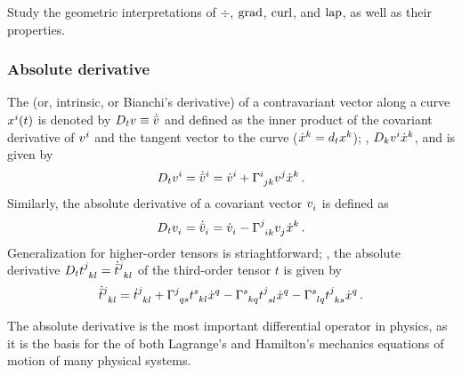 \begin{remark}
  Study the geometric interpretations of $\div$, $\operatorname{grad}$, $\operatorname{curl}$, and $\operatorname{lap}$, as well as their properties.
\end{remark}


\subsubsection{Absolute derivative}
%
The  (or, intrinsic, or Bianchi's derivative) of a contravariant vector along a curve $\tvec\pos i\vat t$ is denoted by $D_tv\equiv\dot{\bar{v}}$ and defined as the inner product of the covariant derivative of $\tvec vi$ and the tangent vector to the curve ($\tvec{\dt\pos}{k} = d_t\tvec\pos k$); \ie, $D_k\tvec vi\tvec{\dt\pos}{k}$, and is given by
%
\begin{equation*}
  D_t\tvec vi = \tvec{\dbder v}i 
              = \tvec{\dt v}i + \skchris ijk\tvec vj\tvec{\dt\pos}{k}\,.
\end{equation*}
%
Similarly, the absolute derivative of a covariant vector $\tcov vi$ is defined as
%
\begin{equation*}
  D_t\tcov vi = \tcov{\dbder v}i 
              = \tcov{\dt v}i - \skchris jik\tcov vj\tvec{\dt\pos}{k}\,.
\end{equation*}
%
Generalization for higher-order tensors is striaghtforward; \ie, the absolute derivative $D_t \tensor{t}{^j_k_l}= \tensor{\dbder t}{^j_k_l}$ of the third-order tensor $t$ is given by
%
\begin{equation*}
  \tensor{\dbder t}{^j_k_l} = \tensor{\dt t}{^j_k_l} + \skchris jqs\tensor{t}{^s_k_l}\tvec{\dt\pos}{q}
                                                     - \skchris skq\tensor{t}{^j_s_l}\tvec{\dt\pos}{q}
                                                     - \skchris slq\tensor{t}{^j_k_s}\tvec{\dt\pos}{q}\,.
\end{equation*}

\begin{remark}
  The absolute derivative is the most important differential operator in physics, as it is the basis for the  of both Lagrange's and Hamilton's mechanics equations of motion of many physical systems.
\end{remark}

